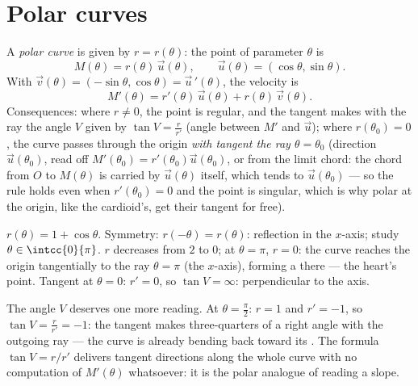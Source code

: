 \section{Polar curves}

\begin{definition}\label{def:b1:curves:polar}
A \emph{polar curve} is given by $r = r(\theta)$:
the point of parameter $\theta$ is
\[
M(\theta) = r(\theta)\,\vec u(\theta),
\qquad \vec u(\theta) = (\cos\theta, \sin\theta).
\]
With $\vec v(\theta) = (-\sin\theta, \cos\theta) = \vec
u\,'(\theta)$, the velocity is
\[
M'(\theta) = r'(\theta)\, \vec u(\theta) + r(\theta)\, \vec
v(\theta) .
\]
Consequences: where $r \neq 0$, the point is regular, and the
tangent makes with the ray the angle $V$ given by $\tan V =
\frac{r}{r'}$ (angle between $M'$ and $\vec u$); where $r(\theta_0)
= 0$, the curve passes through the origin \emph{with tangent the ray
$\theta = \theta_0$} (direction $\vec u(\theta_0)$, read off
$M'(\theta_0) = r'(\theta_0)\vec u(\theta_0)$, or from the limit
chord: the chord from $O$ to $M(\theta)$ is carried by $\vec
u(\theta)$ itself, which tends to $\vec u(\theta_0)$ --- so the
rule holds even when $r'(\theta_0) = 0$ and the point is
singular, which is why polar  at the origin, like the
cardioid's, get their tangent for free).
\end{definition}

\begin{example}\label{ex:b1:curves:cardioid}
$r(\theta) = 1 + \cos\theta$. Symmetry: $r(-\theta)
= r(\theta)$: reflection in the $x$-axis; study $\theta \in
\intcc{0}{\pi}$. $r$ decreases from $2$ to $0$; at $\theta = \pi$,
$r = 0$: the curve reaches the origin tangentially to the ray
$\theta = \pi$ (the $x$-axis), forming a  there --- the heart's
point. Tangent at $\theta = 0$: $r' = 0$, so $\tan V = \infty$:
perpendicular to the axis.

The angle $V$ deserves one more reading. At $\theta =
\frac\pi2$: $r = 1$ and $r' = -1$, so $\tan V = \frac{r}{r'} =
-1$: the tangent makes three-quarters of a right angle with the
outgoing ray --- the curve is already bending back toward its
. The formula $\tan V = r/r'$ delivers tangent directions
along the whole curve with no computation of $M'(\theta)$
whatsoever: it is the polar analogue of reading a slope.
\end{example}

